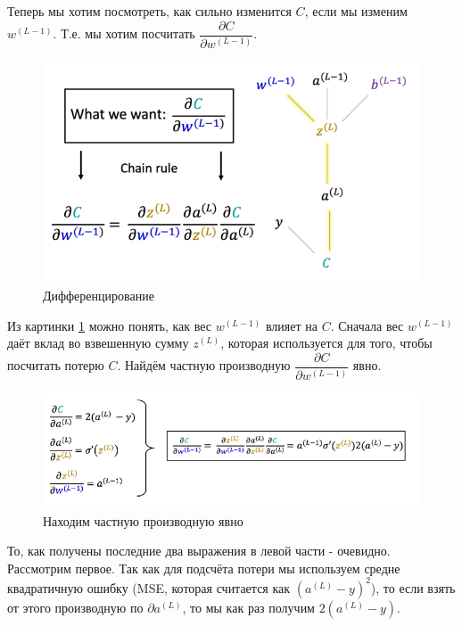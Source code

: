 \documentclass[a4paper, 10pt, openany]{book} %
\begin{document}
	Теперь мы хотим посмотреть, как сильно изменится $C$, если мы изменим $w^{(L-1)}$. Т.е. мы хотим посчитать $\dfrac{\partial C}{\partial w^{(L-1)}}$.
	
	\begin{figure}[h!]
		\centering
		\includegraphics[width=\linewidth]{pictures/backpropagation/chain_rule.png}
		\caption{Дифференцирование}
		\label{derivative_1}
	\end{figure}
	
	Из картинки \ref{derivative_1} можно понять, как вес $w^{(L-1)}$ влияет на $C$. Сначала вес $w^{(L-1)}$ даёт вклад во взвешенную сумму $z^{(L)}$, которая используется для того, чтобы посчитать потерю $C$. Найдём частную производную $\dfrac{\partial C}{\partial w^{(L-1)}}$ явно.
	
	\begin{figure}[h!]
		\centering
		\includegraphics[width=\linewidth]{pictures/backpropagation/derivative_itself.png}
		\caption{Находим частную производную явно}
		\label{derivative_itself_weight}
	\end{figure}
	
	То, как получены последние два выражения в левой части - очевидно. Рассмотрим первое. Так как для подсчёта потери мы используем средне квадратичную ошибку (MSE, которая считается как $(a^{(L)}-y)^2$), то если взять от этого производную по $\partial a^{(L)}$, то мы как раз получим $2(a^{(L)}-y)$.
	
\end{document}
